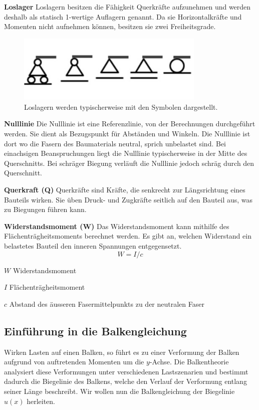 \textbf{Loslager}
Loslagern besitzen die Fähigkeit Querkräfte aufzunehmen und werden deshalb als statisch 1-wertige Auflagern genannt.
Da sie Horizontalkräfte und Momenten nicht aufnehmen können, besitzen sie zwei Freiheitsgrade.
\begin{figure} [h]
	\centering
	\includegraphics[width=0.8\textwidth]{papers/balken/images/teil1/Loslager.jpg}
	\caption{Loslagern werden typischerweise mit den Symbolen dargestellt.}
	\label{fig:Loslagern werden typischerweise mit den Symbolen dargestellt.}
\end{figure}

\textbf{Nulllinie}
Die Nulllinie ist eine Referenzlinie, von der Berechnungen durchgeführt werden. Sie dient als Bezugspunkt für Abständen und Winkeln.
Die Nulllinie ist dort wo die Fasern des Baumaterials neutral, sprich unbelastet sind.
Bei einachsigen Beanspruchungen liegt die Nulllinie typischerweise in der Mitte des Querschnitts.
Bei schräger Biegung verläuft die Nulllinie jedoch schräg durch den Querschnitt.

\textbf{Querkraft (Q)}
Querkräfte sind Kräfte, die senkrecht zur Längsrichtung eines Bauteils wirken.
Sie üben Druck- und Zugkräfte seitlich auf den Bauteil aus, was zu Biegungen führen kann.

\textbf{Widerstandsmoment (W)}
Das Widerstandsmoment kann mithilfe des Flächenträgheitsmoments berechnet werden.
Es gibt an, welchen Widerstand ein belastetes Bauteil den inneren Spannungen entgegensetzt.
\begin{equation}
W=I/c
\end{equation}

$W$ Widerstandsmoment

$I$ Flächenträgheitsmoment

$c$ Abstand des äusseren Fasermittelpunkts zu der neutralen Faser

\subsection{Einführung in die Balkengleichung}
Wirken Lasten auf einen Balken, so führt es zu einer Verformung der Balken aufgrund von auftretenden Momenten um die $y$-Achse.
Die Balkentheorie analysiert diese Verformungen unter verschiedenen Lastszenarien und bestimmt dadurch die Biegelinie des Balkens, welche den Verlauf der Verformung entlang seiner Länge beschreibt.
Wir wollen nun die Balkengleichung der Biegelinie $u(x)$ herleiten.

